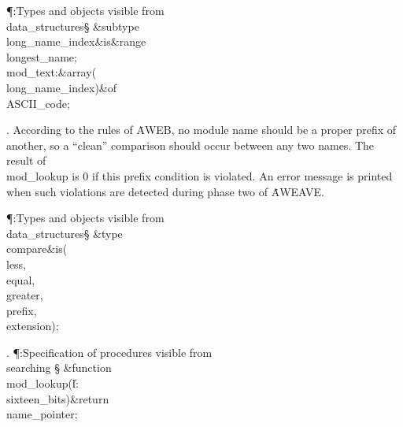 \Y\P\?\4:Types and objects visible from \\{data\_structures}\X\mathrel{+}\S%
\?\6
\&{subtype}\8\\{long\_name\_index}\8\&{is}\8\8\&{range}\?\to\?%
\\{longest\_name};\6
\\{mod\_text}\?:\1\&{array}\8\1(\?\\{long\_name\_index}\?\2)\2\8\&{of}\?\8%
\\{ASCII\_code};\par
\fi

. According to the rules of \.{AWEB}, no module name
should be a proper prefix of another, so a ``clean'' comparison should
occur between any two names. The result of \\{mod\_lookup} is 0 if this
prefix condition is violated. An error message is printed when such violations
are detected during phase two of \.{AWEAVE}.

\Y\P\?\4:Types and objects visible from \\{data\_structures}\X\mathrel{+}\S%
\?\6
\&{type}\8\\{compare}\8\&{is}\?\8\1(\?\\{less}\?,\?\\{equal}\?,\?%
\\{greater}\?,\?\\{prefix}\?,\?\\{extension}\?\2)\?;\par
\fi

. \P\?:Specification of procedures visible from \\{searching}\X%
\mathrel{+}\S\?\6
\&{function}\8\1\\{mod\_lookup}\?(\1\?\|l\?:\?\\{sixteen\_bits}\?\2)\&{return}%
\?\8\\{name\_pointer}\2;\par
\fi

